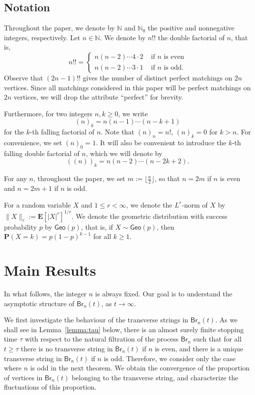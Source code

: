\documentclass[a4paper,11pt,reqno]{amsart}
\newcommand{\IN}{\mathbb{N}}
\newcommand{\bP}{\mathbf{P}}
\newcommand{\bE}{\mathbf{E}}
\newcommand{\Br}{\mathsf{Br}}
\newcommand{\Geo}{\mathsf{Geo}}
\newcommand{\fdf}[1]{(\!(#1)\!)}
\theoremstyle{definition}
\begin{document}
\subsection*{Notation}
Throughout the paper, we denote by $\IN$ and $\IN_0$ the positive and nonnegative integers, respectively. Let $n\in\IN$. We denote by $n!!$ the double factorial of $n$, that is,
\[
 n!! = \begin{cases} n(n-2)\cdots4\cdot2 & \text{ if $n$ is even}\\ n(n-2)\cdots3\cdot1 & \text{ if $n$ is odd.} \end{cases}
\]
Observe that $(2n-1)!!$ gives the number of distinct perfect matchings on $2n$ vertices. Since all matchings considered in this paper will be perfect matchings on $2n$ vertices, we will drop the attribute ``perfect'' for brevity. 

Furthermore, for two integers $n,k\geq 0$, we write
\[
 (n)_k=n(n-1)\cdots(n-k+1)
\]
for the $k$-th falling factorial of $n$. Note that $(n)_n=n!$, $(n)_k=0$ for $k>n$. For convenience, we set $(n)_0=1$. It will also be convenient to introduce the $k$-th falling double factorial of $n$, which we will denote by 
\[
 \fdf{n}_k=n(n-2)\cdots(n-2k+2).
\]

For any $n$, throughout the paper, we set $m:=\lfloor \frac{n}{2} \rfloor$, so that $n=2m$ if $n$ is even and $n=2m+1$ if $n$ is odd.

For a random variable $X$ and $1\leq r<\infty$, we denote the $L^r$-norm of $X$ by $\|X\|_r :=\bE[|X|^r]^{1/r}$. We denote the geometric distribution with success probability $p$ by $\Geo(p)$, that is, if $X \sim \Geo(p)$, then $\bP (X=k) = p (1-p)^{k-1}$ for all $k \geq 1$.





\section{Main Results}
\label{sec:results}

In what follows, the integer $n$ is always fixed. Our goal is to understand the asymptotic structure of $\Br_n(t)$, as $t \to \infty$. 

We first investigate the behaviour of the transverse strings in $\Br_n(t)$. As we shall see in Lemma~\ref{lemma:tau} below, there is an almost surely finite stopping time $\tau$ with respect to the natural filtration of the process $\Br_n$ such that for all $t\geq\tau$ there is no transverse string in $\Br_n(t)$ if $n$ is even, and there is a unique transverse string in $\Br_n(t)$ if $n$ is odd. Therefore, we consider only the case where $n$ is odd in the next theorem. We obtain the convergence of the proportion of vertices in $\Br_n(t)$ belonging to the transverse string, and characterize the fluctuations of this proportion.
\end{document}
